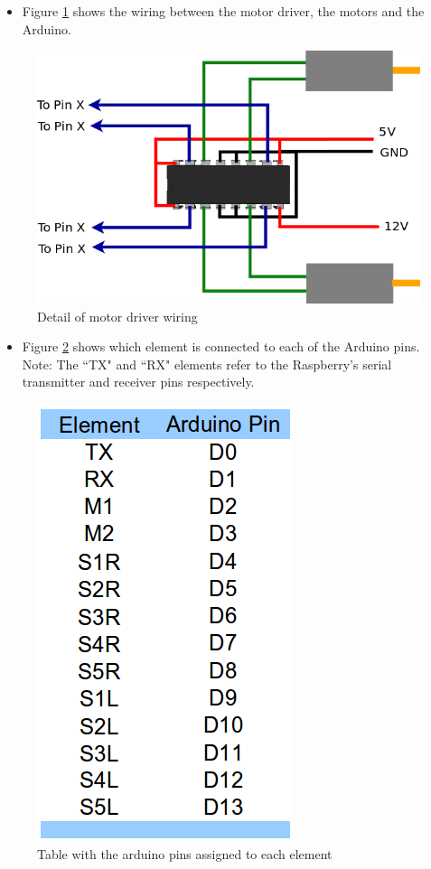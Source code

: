 	\bigskip
	\begin{itemize}
	\item Figure \ref{hbridgeDetail} shows the wiring between the motor driver, the motors and the Arduino.
	\end{itemize}
	
	\begin{figure}[H]
			\centering
			\includegraphics[scale=0.5, angle=0]{images/Diagrams/hbridge.png}
			\caption{Detail of motor driver wiring }
			\label{hbridgeDetail}
	\end{figure}
	\bigskip

	\begin{itemize}
	\item Figure \ref{conexiones} shows which element is connected to each of the Arduino pins.\\
	Note: The ``TX" and ``RX" elements refer to the Raspberry's serial transmitter and receiver pins respectively.
	\end{itemize}

	\begin{figure}[H]
			\centering
			\includegraphics[scale=0.5, angle=0]{Solution/conexiones.png}
			\caption{Table with the arduino pins assigned to each element}
			\label{conexiones}
	\end{figure}
	\bigskip


